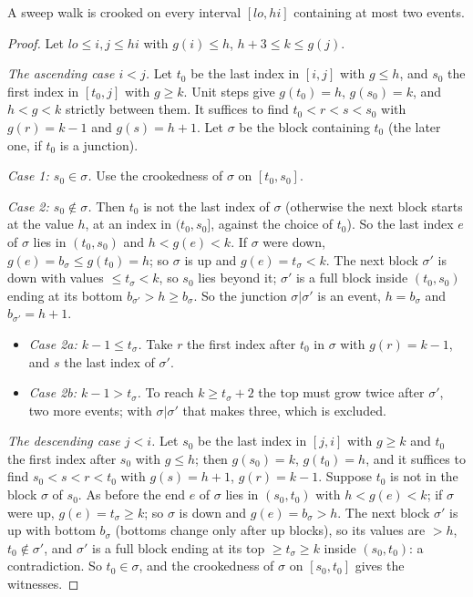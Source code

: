 \begin{theorem}\label{thm:sweep}
A sweep walk is crooked on every interval $[lo,hi]$ containing at most two events.
\end{theorem}

\begin{proof}
Let $lo\le i,j\le hi$ with $g(i)\le h$, $h+3\le k\le g(j)$.

\emph{The ascending case $i<j$.} Let $t_0$ be the last index in $[i,j]$ with $g\le h$, and $s_0$ the first index in $[t_0,j]$ with $g\ge k$. Unit steps give $g(t_0)=h$, $g(s_0)=k$, and
$h<g<k$ strictly between them. It suffices to find $t_0<r<s<s_0$ with $g(r)=k-1$ and $g(s)=h+1$. Let $\sigma$ be the block containing $t_0$ (the later one, if $t_0$ is a junction).

\emph{Case 1: $s_0\in\sigma$.} Use the crookedness of $\sigma$ on $[t_0,s_0]$.

\emph{Case 2: $s_0\notin\sigma$.} Then $t_0$ is not the last index of $\sigma$ (otherwise the next block starts at the value $h$, at an index in $(t_0,s_0]$, against the choice of
$t_0$). So the last index $e$ of $\sigma$ lies in $(t_0,s_0)$ and $h<g(e)<k$. If $\sigma$ were down, $g(e)=b_\sigma\le g(t_0)=h$; so $\sigma$ is up and $g(e)=t_\sigma<k$. The next block
$\sigma'$ is down with values $\le t_\sigma<k$, so $s_0$ lies beyond it; $\sigma'$ is a full block inside $(t_0,s_0)$ ending at its bottom $b_{\sigma'}>h\ge b_\sigma$. So the junction
$\sigma|\sigma'$ is an event, $h=b_\sigma$ and $b_{\sigma'}=h+1$.
\begin{itemize}
\item \emph{Case 2a: $k-1\le t_\sigma$.} Take $r$ the first index after $t_0$ in $\sigma$ with $g(r)=k-1$, and $s$ the last index of $\sigma'$.
\item \emph{Case 2b: $k-1>t_\sigma$.} To reach $k\ge t_\sigma+2$ the top must grow twice after $\sigma'$, two more events; with $\sigma|\sigma'$ that makes three, which is excluded.
\end{itemize}

\emph{The descending case $j<i$.} Let $s_0$ be the last index in $[j,i]$ with $g\ge k$ and $t_0$ the first index after $s_0$ with $g\le h$; then $g(s_0)=k$, $g(t_0)=h$, and it suffices to find
$s_0<s<r<t_0$ with $g(s)=h+1$, $g(r)=k-1$. Suppose $t_0$ is not in the block $\sigma$ of $s_0$. As before the end $e$ of $\sigma$ lies in $(s_0,t_0)$ with $h<g(e)<k$; if $\sigma$ were up,
$g(e)=t_\sigma\ge k$; so $\sigma$ is down and $g(e)=b_\sigma>h$. The next block $\sigma'$ is up with bottom $b_\sigma$ (bottoms change only after up blocks), so its values are $>h$, $t_0\notin\sigma'$, and
$\sigma'$ is a full block ending at its top $\ge t_\sigma\ge k$ inside $(s_0,t_0)$: a contradiction. So $t_0\in\sigma$, and the crookedness of $\sigma$ on $[s_0,t_0]$ gives the witnesses.
\end{proof}

